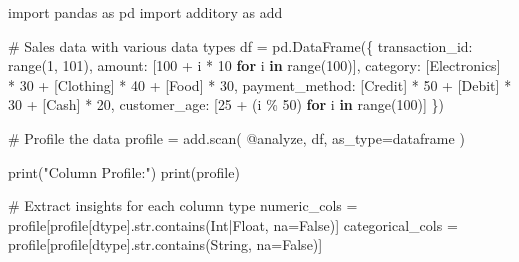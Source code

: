 \documentclass[
  letterpaper,
]{scrbook}
\newenvironment{Shaded}{\begin{snugshade}}{\end{snugshade}}
\newcommand{\BuiltInTok}[1]{\textcolor[rgb]{0.00,0.23,0.31}{#1}}
\newcommand{\CommentTok}[1]{\textcolor[rgb]{0.37,0.37,0.37}{#1}}
\newcommand{\ControlFlowTok}[1]{\textcolor[rgb]{0.00,0.23,0.31}{\textbf{#1}}}
\newcommand{\DecValTok}[1]{\textcolor[rgb]{0.68,0.00,0.00}{#1}}
\newcommand{\ImportTok}[1]{\textcolor[rgb]{0.00,0.46,0.62}{#1}}
\newcommand{\KeywordTok}[1]{\textcolor[rgb]{0.00,0.23,0.31}{\textbf{#1}}}
\newcommand{\NormalTok}[1]{\textcolor[rgb]{0.00,0.23,0.31}{#1}}
\newcommand{\OperatorTok}[1]{\textcolor[rgb]{0.37,0.37,0.37}{#1}}
\newcommand{\StringTok}[1]{\textcolor[rgb]{0.13,0.47,0.30}{#1}}
\newcommand{\VariableTok}[1]{\textcolor[rgb]{0.07,0.07,0.07}{#1}}
\begin{document}
\begin{Shaded}
\begin{Highlighting}[]
\ImportTok{import}\NormalTok{ pandas }\ImportTok{as}\NormalTok{ pd}
\ImportTok{import}\NormalTok{ additory }\ImportTok{as}\NormalTok{ add}

\CommentTok{\# Sales data with various data types}
\NormalTok{df }\OperatorTok{=}\NormalTok{ pd.DataFrame(\{}
    \StringTok{\textquotesingle{}transaction\_id\textquotesingle{}}\NormalTok{: }\BuiltInTok{range}\NormalTok{(}\DecValTok{1}\NormalTok{, }\DecValTok{101}\NormalTok{),}
    \StringTok{\textquotesingle{}amount\textquotesingle{}}\NormalTok{: [}\DecValTok{100} \OperatorTok{+}\NormalTok{ i }\OperatorTok{*} \DecValTok{10} \ControlFlowTok{for}\NormalTok{ i }\KeywordTok{in} \BuiltInTok{range}\NormalTok{(}\DecValTok{100}\NormalTok{)],}
    \StringTok{\textquotesingle{}category\textquotesingle{}}\NormalTok{: [}\StringTok{\textquotesingle{}Electronics\textquotesingle{}}\NormalTok{] }\OperatorTok{*} \DecValTok{30} \OperatorTok{+}\NormalTok{ [}\StringTok{\textquotesingle{}Clothing\textquotesingle{}}\NormalTok{] }\OperatorTok{*} \DecValTok{40} \OperatorTok{+}\NormalTok{ [}\StringTok{\textquotesingle{}Food\textquotesingle{}}\NormalTok{] }\OperatorTok{*} \DecValTok{30}\NormalTok{,}
    \StringTok{\textquotesingle{}payment\_method\textquotesingle{}}\NormalTok{: [}\StringTok{\textquotesingle{}Credit\textquotesingle{}}\NormalTok{] }\OperatorTok{*} \DecValTok{50} \OperatorTok{+}\NormalTok{ [}\StringTok{\textquotesingle{}Debit\textquotesingle{}}\NormalTok{] }\OperatorTok{*} \DecValTok{30} \OperatorTok{+}\NormalTok{ [}\StringTok{\textquotesingle{}Cash\textquotesingle{}}\NormalTok{] }\OperatorTok{*} \DecValTok{20}\NormalTok{,}
    \StringTok{\textquotesingle{}customer\_age\textquotesingle{}}\NormalTok{: [}\DecValTok{25} \OperatorTok{+}\NormalTok{ (i }\OperatorTok{\%} \DecValTok{50}\NormalTok{) }\ControlFlowTok{for}\NormalTok{ i }\KeywordTok{in} \BuiltInTok{range}\NormalTok{(}\DecValTok{100}\NormalTok{)]}
\NormalTok{\})}

\CommentTok{\# Profile the data}
\NormalTok{profile }\OperatorTok{=}\NormalTok{ add.scan(}
    \StringTok{\textquotesingle{}@analyze\textquotesingle{}}\NormalTok{,}
\NormalTok{    df,}
\NormalTok{    as\_type}\OperatorTok{=}\StringTok{\textquotesingle{}dataframe\textquotesingle{}}
\NormalTok{)}

\BuiltInTok{print}\NormalTok{(}\StringTok{"Column Profile:"}\NormalTok{)}
\BuiltInTok{print}\NormalTok{(profile)}

\CommentTok{\# Extract insights for each column type}
\NormalTok{numeric\_cols }\OperatorTok{=}\NormalTok{ profile[profile[}\StringTok{\textquotesingle{}dtype\textquotesingle{}}\NormalTok{].}\BuiltInTok{str}\NormalTok{.contains(}\StringTok{\textquotesingle{}Int|Float\textquotesingle{}}\NormalTok{, na}\OperatorTok{=}\VariableTok{False}\NormalTok{)]}
\NormalTok{categorical\_cols }\OperatorTok{=}\NormalTok{ profile[profile[}\StringTok{\textquotesingle{}dtype\textquotesingle{}}\NormalTok{].}\BuiltInTok{str}\NormalTok{.contains(}\StringTok{\textquotesingle{}String\textquotesingle{}}\NormalTok{, na}\OperatorTok{=}\VariableTok{False}\NormalTok{)]}


\end{Highlighting}
\end{Shaded}
\end{document}
